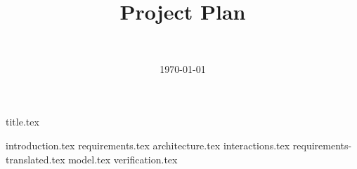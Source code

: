 \documentclass[final]{report}
\title{Project Plan}
\author{~}
\date{\today}
\begin{document}

{title.tex}
\newpage
\tableofcontents

\newpage
{}
{introduction.tex}
{requirements.tex}
{architecture.tex}
{interactions.tex}
{requirements-translated.tex}
{model.tex}
{verification.tex}
\newpage
{}

\end{document}
